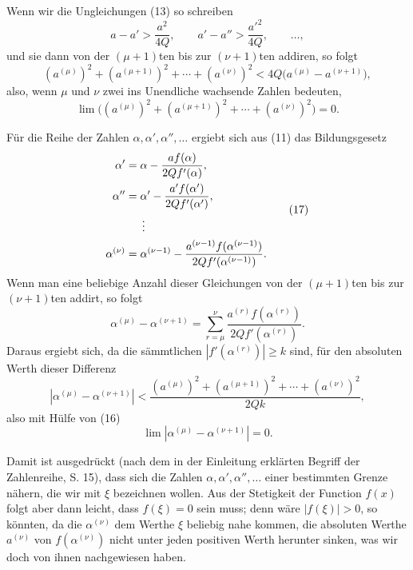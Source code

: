 \documentclass[11pt]{article}
\begin{document}
Wenn wir die Ungleichungen (13) so schreiben
\[
 a-a'>\frac{a^2}{4Q},\qquad
 a'-a''>\frac{a'^2}{4Q},\qquad\ldots,
\]
und sie dann von der $(\mu+1)$ten bis zur $(\nu+1)$ten addiren, so folgt
\[
 (a^{(\mu)})^2+(a^{(\mu+1)})^2+\cdots+(a^{(\nu)})^2
 <4Q\bigl(a^{(\mu)}-a^{(\nu+1)}\bigr),
\]
also, wenn $\mu$ und $\nu$ zwei ins Unendliche wachsende Zahlen bedeuten,
\begin{equation}
 \lim\bigl((a^{(\mu)})^2+(a^{(\mu+1)})^2+\cdots+(a^{(\nu)})^2\bigr)=0.
\tag{16}
\end{equation}

Für die Reihe der Zahlen $\alpha,\alpha',\alpha'',\ldots$ ergiebt sich aus (11) das Bildungsgesetz
\begin{equation}
\begin{aligned}
 \alpha'&=\alpha-\frac{a f(\alpha)}{2Q f'(\alpha)},\\
 \alpha''&=\alpha'-\frac{a' f(\alpha')}{2Q f'(\alpha')},\\
 &\hspace{1.5em}\vdots\\
 \alpha^{(\nu)}&=\alpha^{(\nu-1)}-
 \frac{a^{(\nu-1)} f(\alpha^{(\nu-1)})}{2Q f'(\alpha^{(\nu-1)})}.
\end{aligned}
\tag{17}
\end{equation}
Wenn man eine beliebige Anzahl dieser Gleichungen von der $(\mu+1)$ten bis zur $(\nu+1)$ten addirt, so folgt
\begin{equation}
 \alpha^{(\mu)}-\alpha^{(\nu+1)}=
 \sum_{r=\mu}^{\nu}\frac{a^{(r)}f(\alpha^{(r)})}{2Q f'(\alpha^{(r)})}.
\tag{18}
\end{equation}
Daraus ergiebt sich, da die sämmtlichen $|f'(\alpha^{(r)})|\ge k$ sind, für den absoluten Werth dieser Differenz
\begin{equation}
 |\alpha^{(\mu)}-\alpha^{(\nu+1)}|<
 \frac{(a^{(\mu)})^2+(a^{(\mu+1)})^2+\cdots+(a^{(\nu)})^2}{2Qk},
\tag{19}
\end{equation}
also mit Hülfe von (16)
\begin{equation}
 \lim |\alpha^{(\mu)}-\alpha^{(\nu+1)}|=0.
\tag{20}
\end{equation}

Damit ist ausgedrückt (nach dem in der Einleitung erklärten Begriff der Zahlenreihe, S. 15), dass sich die Zahlen $\alpha,\alpha',\alpha'',\ldots$ einer bestimmten Grenze nähern, die wir mit $\xi$ bezeichnen wollen. Aus der Stetigkeit der Function $f(x)$ folgt aber dann leicht, dass $f(\xi)=0$ sein muss; denn wäre $|f(\xi)|>0$, so könnten, da die $\alpha^{(\nu)}$ dem Werthe $\xi$ beliebig nahe kommen, die absoluten Werthe $a^{(\nu)}$ von $f(\alpha^{(\nu)})$ nicht unter jeden positiven Werth herunter sinken, was wir doch von ihnen nachgewiesen haben.
\end{document}
